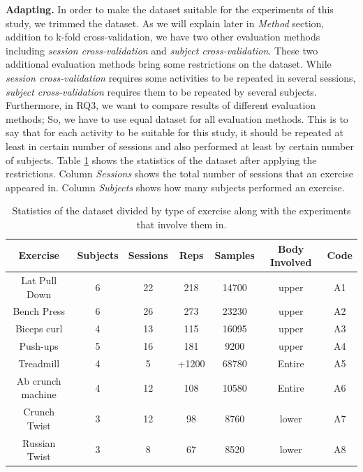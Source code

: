 \documentclass[journal,article,submit,moreauthors,pdftex]{Definitions/mdpi}
\begin{document}
\noindent\textbf{Adapting.} In order to make the dataset suitable for the experiments of this study, we trimmed the dataset. As we will explain later in \textit{Method} section, addition to k-fold cross-validation, we have two other evaluation methods including \textit{session cross-validation} and \textit{subject cross-validation}. These two additional evaluation methods bring some restrictions on the dataset. While \textit{session cross-validation} requires some activities to be repeated in several sessions, \textit{subject cross-validation} requires them to be repeated by several subjects. Furthermore, in RQ3, we want to compare results of different evaluation methods; So, we have to use equal dataset for all evaluation methods. This is to say that for each activity to be suitable for this study, it should be repeated at least in certain number of sessions and also performed at least by certain number of subjects.
Table \ref{dataset_statistics} shows the statistics of the dataset after applying the restrictions. Column \textit{Sessions} shows the total number of sessions that an exercise appeared in. Column \textit{Subjects} shows how many subjects performed an exercise.
\begin{table}[H]
	\caption{Statistics of the dataset divided by type of exercise along with the experiments that involve them in.}
	\centering
	\begin{tabular}{ccccc|cc}
		\toprule
		\textbf{Exercise} & \textbf{Subjects} & \textbf{Sessions}	 & \textbf{Reps} & \textbf{Samples}& \textbf{Body Involved}	& \textbf{Code}  \\
		\midrule		
		Lat Pull Down& 6& 22& 218& 14700& upper 		& A1\\
		Bench Press	& 6& 26& 273& 23230& upper 			& A2\\
		Biceps curl	& 4& 13& 115& 16095& upper			& A3\\
		Push-ups & 5& 16& 181& 9200& upper			& A4\\
		Treadmill& 4& 5& +1200 & 68780& Entire 			& A5\\
		Ab crunch machine& 4& 12& 108 & 10580& Entire & A6\\
		Crunch Twist &  3& 12& 98& 8760& lower			& A7 \\
		Russian Twist & 3& 8& 67& 8520& lower			& A8\\
		\bottomrule
	\end{tabular}
	\label{dataset_statistics}
\end{table}
\end{document}

